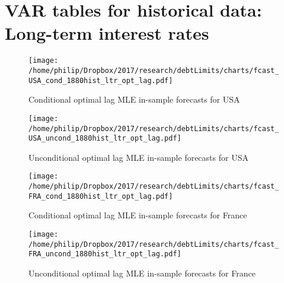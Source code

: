 \documentclass{article}
\begin{document}
\section*{VAR tables for historical data: Long-term interest rates}

	{\def\arraystretch{1.2}\tabcolsep=2pt
		
		
		
		
		
		
		
		
		
		
		
		
		
		
		
		
		
		
		
		
		
		
		
		
		
	}





	\newpage

	\begin{figure}[htbp]
	    \centering
		\texttt{[image: /home/philip/Dropbox/2017/research/debtLimits/charts/fcast\_USA\_cond\_1880hist\_ltr\_opt\_lag.pdf]}
		\caption{Conditional optimal lag MLE in-sample forecasts for USA}
	\end{figure}
	
	\begin{figure}[htbp]
	    \centering
		\texttt{[image: /home/philip/Dropbox/2017/research/debtLimits/charts/fcast\_USA\_uncond\_1880hist\_ltr\_opt\_lag.pdf]}
		\caption{Unconditional optimal lag MLE in-sample forecasts for USA}
	\end{figure}
	
	
	\begin{figure}[htbp]
	    \centering
		\texttt{[image: /home/philip/Dropbox/2017/research/debtLimits/charts/fcast\_FRA\_cond\_1880hist\_ltr\_opt\_lag.pdf]}
		\caption{Conditional optimal lag MLE in-sample forecasts for France}
	\end{figure}
	
	\begin{figure}[htbp]
	    \centering
		\texttt{[image: /home/philip/Dropbox/2017/research/debtLimits/charts/fcast\_FRA\_uncond\_1880hist\_ltr\_opt\_lag.pdf]}
		\caption{Unconditional optimal lag MLE in-sample forecasts for France}
	\end{figure}
	
\end{document}

